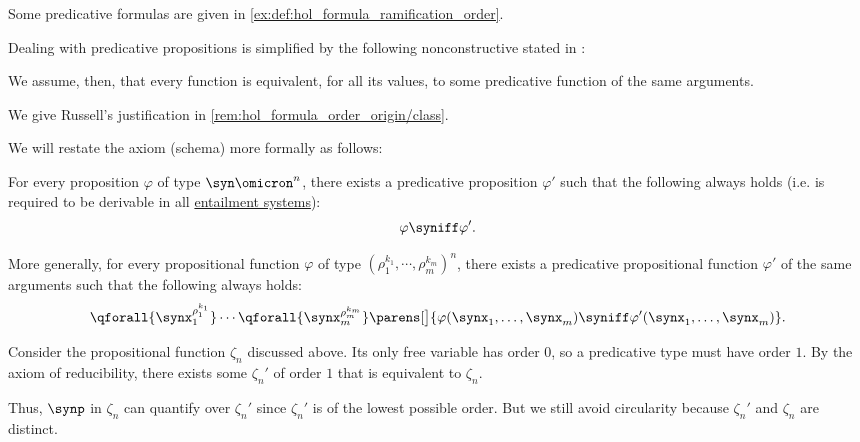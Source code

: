\begin{definition}
\begin{thmenum}
    Some predicative formulas are given in \cref{ex:def:hol_formula_ramification_order}.

     Dealing with predicative propositions is simplified by the following nonconstructive  stated in \cite[241]{Russell1908TypeTheory}:
    \begin{displayquote}
      We assume, then, that every function is equivalent, for all its values, to some predicative function of the same arguments.
    \end{displayquote}

    We give Russell's justification in \cref{rem:hol_formula_order_origin/class}.

    We will restate the axiom (schema) more formally as follows:
    \begin{displayquote}
      For every proposition \( \varphi \) of type \( \syn\omicron^n \), there exists a predicative proposition \( \varphi' \) such that the following always holds (i.e. is required to be derivable in all \hyperref[def:entailment_system]{entailment systems}):
      \begin{equation*}
        \varphi \syniff \varphi'.
      \end{equation*}

      More generally, for every propositional function \( \varphi \) of type \( (\rho_1^{k_1}, \cdots, \rho_m^{k_m})^n \), there exists a predicative propositional function \( \varphi' \) of the same arguments such that the following always holds:
      \begin{equation*}
        \qforall {\synx_1^{\rho_1^{k_1}}} \cdots \qforall {\synx_m^{\rho_m^{k_m}}} \parens[\big]{ \varphi(\synx_1, \ldots, \synx_m) \syniff \varphi'(\synx_1, \ldots, \synx_m) }.
      \end{equation*}
    \end{displayquote}

    Consider the propositional function \( \zeta_n \) discussed above. Its only free variable has order \( 0 \), so a predicative type must have order \( 1 \). By the axiom of reducibility, there exists some \( \zeta_n' \) of order \( 1 \) that is equivalent to \( \zeta_n \).

    Thus, \( \synp \) in \( \zeta_n \) can quantify over \( \zeta_n' \) since \( \zeta_n' \) is of the lowest possible order. But we still avoid circularity because \( \zeta_n' \) and \( \zeta_n \) are distinct.
  \end{thmenum}
\end{definition}

